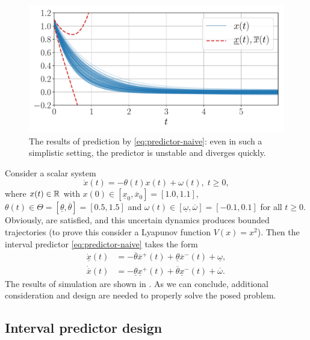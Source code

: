 \begin{example*}[motivating]
	\begin{figure}[t]
		\begin{centering}
			\includegraphics[width=0.8\linewidth]{img/observer}
			\par\end{centering}
		\caption{\label{fig:IP_Direct} The results of prediction by \eqref{eq:predictor-naive}: even in such a simplistic setting, the predictor is unstable and diverges quickly.}
	\end{figure}
	Consider a scalar system
	\[
	\dot{x}(t)=-\theta(t)x(t)+\omega(t),\;t\geq0,
	\]
	where $x(t)\in\mathbb{R}$ with $x(0)\in[\underline{x}_{0},\overline{x}_{0}]=[1.0, 1.1]$, $\theta(t)\in\Theta=[\underline{\theta},\overline{\theta}]=[0.5,1.5]$ and $\omega(t)\in[\underline{\omega},\overline{\omega}]=[-0.1,0.1]$ for all $t\geq0$. Obviously,  are satisfied, and this uncertain dynamics produces bounded trajectories (to prove this consider a Lyapunov function $V(x)=x^{2}$). Then the interval predictor \eqref{eq:predictor-naive} takes the form
	\begin{align*}
		\dot{\underline{x}}(t) & = -\overline{\theta}\overline{x}^{+}(t)+\underline{\theta}\overline{x}^{-}(t)+\underline{\omega},\\
		\dot{\overline{x}}(t) & = -\underline{\theta}\underline{x}^{+}(t)+\overline{\theta}\underline{x}^{-}(t)+\overline{\omega}.
	\end{align*}
	The results of simulation are shown in . As we can conclude, additional consideration and design are needed to properly solve the posed problem.
\end{example*}

\subsection{Interval predictor design}
\label{sec:Main-results}

